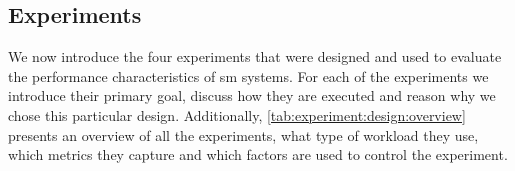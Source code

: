 \subsection{Experiments}
\label{sec:experiments:design:overview}

We now introduce the four experiments that were designed and used to evaluate the performance characteristics of \gls{sm} systems. For each of the experiments we introduce their primary goal, discuss how they are executed and reason why we chose this particular design. Additionally, \cref{tab:experiment:design:overview} presents an overview of all the experiments, what type of workload they use, which  metrics they capture and which factors  are used to control the experiment.




